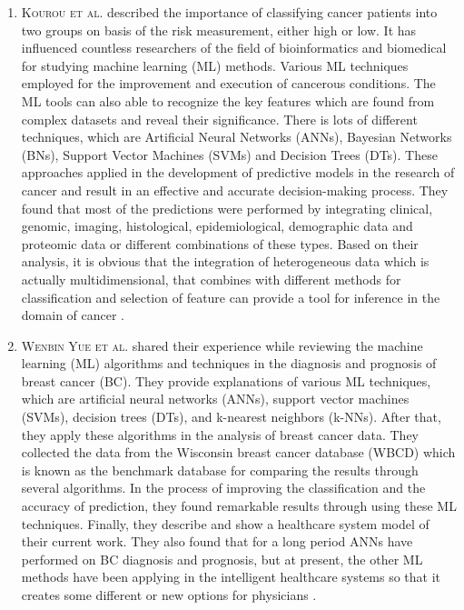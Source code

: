 \begin{enumerate}
    \item \textsc{Kourou et al.} described the importance of classifying cancer patients into two groups on basis of the risk measurement, either high or low. It has influenced countless researchers of the field of bioinformatics and biomedical for studying machine learning (ML) methods. Various ML techniques employed for the improvement and execution of cancerous conditions. The ML tools can also able to recognize the key features which are found from complex datasets and reveal their significance. There is lots of different techniques, which are Artificial Neural Networks (ANNs), Bayesian Networks (BNs), Support Vector Machines (SVMs)  and Decision Trees (DTs). These approaches applied in the development of predictive models in the research of cancer and result in an effective and accurate decision-making process. They found that most of the predictions were performed by integrating clinical, genomic, imaging,  histological, epidemiological, demographic data and proteomic data or different combinations of these types. Based on their analysis, it is obvious that the integration of heterogeneous data which is actually multidimensional, that combines with different methods for classification and selection of feature can provide a tool for inference in the domain of cancer \cite{KOUROU20158}.
    
    \item \textsc{Wenbin Yue et al.} shared their experience while reviewing the machine learning (ML) algorithms  and techniques in the diagnosis and prognosis of breast cancer (BC). They provide explanations of various ML techniques, which are artificial neural networks (ANNs), support vector machines (SVMs), decision trees (DTs), and k-nearest neighbors (k-NNs). After that, they apply these algorithms in the analysis of breast cancer data. They collected the data from the Wisconsin breast cancer database (WBCD) which is known as the benchmark database for comparing the results through several algorithms. In the process of improving the classification and the accuracy of prediction, they found remarkable results through using these ML techniques. Finally, they describe and show a healthcare system model of their current work.  They also found that for a long period ANNs have performed on BC diagnosis and prognosis, but at present, the other ML methods have been applying in the intelligent healthcare systems so that it creates some different or new options for physicians \cite{designs2020013}.
  

  
  
  
  

  
  
  
\end{enumerate}




